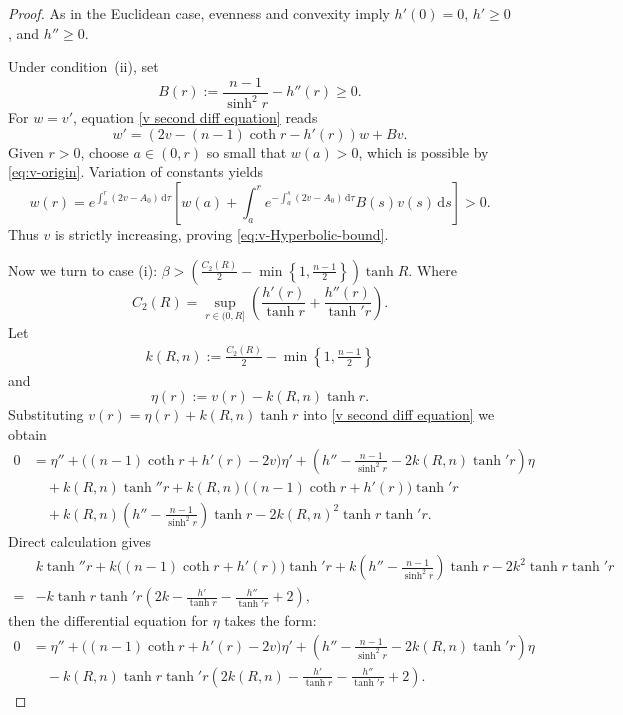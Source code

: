 \documentclass[11pt,leqno]{amsart}
\newcommand{\dd}{\,\mathrm d}
\numberwithin{equation}{section}
\begin{document}
\begin{proof}
As in the Euclidean case, evenness and convexity imply
\(h'(0)=0\), \(h'\geq0\), and \(h''\geq0\).  

Under condition~\textup{(ii)}, set
\[
B(r):=\frac{n-1}{\sinh^2r}-h''(r)\geq0.
\]
For \(w=v'\), equation
\eqref{v second diff equation} reads
\[
w'=\left(2v-(n-1)\coth r-h'(r)\right)w+Bv.
\]
Given \(r>0\), choose \(a\in(0,r)\) so small that \(w(a)>0\), which
is possible by \eqref{eq:v-origin}.  Variation of constants yields
\[
w(r)
=
e^{\int_a^r(2v-A_0)\dd\tau}
\left[
w(a)+
\int_a^r
e^{-\int_a^s(2v-A_0)\dd\tau}B(s)v(s)\dd s
\right]>0.
\]
Thus \(v\) is strictly increasing, proving
\eqref{eq:v-Hyperbolic-bound}.	
	


Now we turn to case (i): $\beta > \left(\frac{C_{2}(R)}{2}-\min\left\{1,\frac{n-1}{2}\right\}\right)\tanh R$. Where 
$$C_{2}(R)=\sup_{r\in (0,R]}\left(\frac{h'(r)}{\tanh r}+\frac{h''(r)}{\tanh' r}\right).$$
Let 
\begin{align*}
   k (R, n):=\frac{C_2(R)}{2}-\min\left\{1,\frac{n-1}{2}\right\}
\end{align*}
and 
$$\eta(r) := v(r) - k(R, n)\tanh r.$$ 
Substituting $v(r) = \eta(r) + k(R, n)\tanh r$ into \eqref{v second diff equation} we obtain
\begin{align*}
    0 &= \eta'' + \big((n-1)\coth r+h'(r)-2v\big)\eta' + \left(h''-\frac{n-1}{\sinh^{2}r}-2k(R, n)\tanh' r\right)\eta \\
    &\quad + k(R, n)\tanh'' r + k(R, n)\big((n-1)\coth r+h'(r)\big)\tanh' r\\
    &\quad + k(R, n)\left(h''-\frac{n-1}{\sinh^{2}r}\right)\tanh r - 2k(R, n)^{2}\tanh r\tanh' r.
\end{align*}
Direct calculation gives
\begin{align*}
    &k\tanh'' r + k\big((n-1)\coth r+h'(r)\big)\tanh' r + k\left(h''-\frac{n-1}{\sinh^{2}r}\right)\tanh r - 2k^{2}\tanh r\tanh' r\\
    =&-k\tanh r\tanh' r\left(2k-\frac{h'}{\tanh r}-\frac{h''}{\tanh' r}+2\right),
\end{align*}
then the differential equation for $\eta$ takes the form:
\begin{align}\label{eq:xi Hn}
    0 &= \eta'' + \big((n-1)\coth r+h'(r)-2v\big)\eta' + \left(h''-\frac{n-1}{\sinh^{2}r}-2k(R, n)\tanh' r\right)\eta \nonumber \\
    &\quad - k(R, n)\tanh r\tanh' r\left(2k(R, n)-\frac{h'}{\tanh r}-\frac{h''}{\tanh' r}+2\right).
\end{align}


\end{proof}
\end{document}
